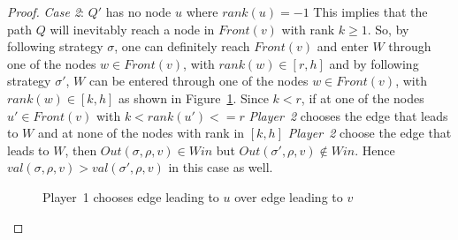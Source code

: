\begin{proof}
	\textit{Case 2}: $Q'$ has no node $u$ where $rank(u) = -1$
	\newline This implies that the path $Q$ will inevitably reach a node
	in $\mathit{Front}(v)$ with rank $k \geq 1$. So, by following
	strategy $\sigma$, one can definitely reach $\mathit{Front}(v)$ and
	enter $W$ through one of the nodes $w \in \mathit{Front}(v)$, with
	$rank(w) \in [r,h]$ and by following strategy $\sigma'$, $W$ can be entered through one of the nodes $w \in \mathit{Front}(v)$, with $rank(w)
	\in [k,h]$ as shown in Figure~\ref{figurelabel4}. Since $k < r$, if
	at one of the nodes $u' \in \mathit{Front}(v)$ with $k < rank(u') <=
	r$ \textit{Player~2} chooses the edge that leads to $W$ and at none
	of the nodes with rank in $[k,h]$ \textit{Player~2} choose the edge
	that leads to $W$, then $Out(\sigma,\rho,v) \in \mathit{Win}$ but
	$Out(\sigma',\rho,v) \notin \mathit{Win}$. Hence $val(\sigma,\rho,v)
	> val(\sigma',\rho,v)$ in this case as well.
	\begin{figure}[thpb]
		\centering
		\caption{Player~1 chooses edge leading to $u$ over edge leading to $v$}
		\label{figurelabel4}
	\end{figure}
\end{proof}

